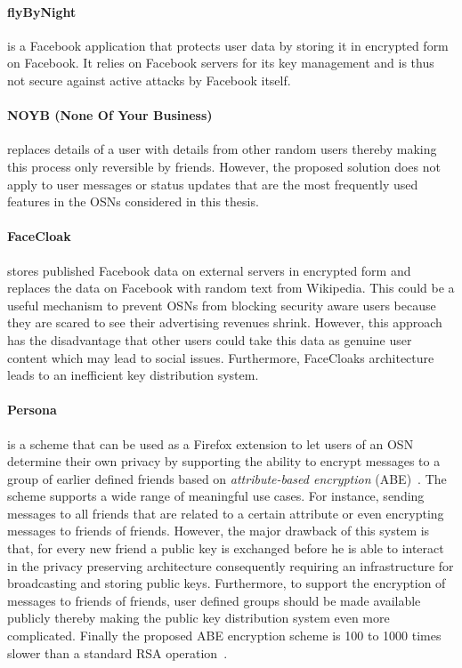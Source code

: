 \paragraph{flyByNight~\cite{art:LucasB09}} is a Facebook application that protects user data by storing it in encrypted form on Facebook. It relies on Facebook servers for its key management and is thus not secure against active attacks by Facebook itself.

\paragraph{NOYB (None Of Your Business)~\cite{art:GuhaSTF08}} replaces details of a user with details from other random users thereby making this process only reversible by friends. However, the proposed solution does not apply to user messages or status updates that are the most frequently used features in the OSNs considered in this thesis.

\paragraph{FaceCloak~\cite{art:LuoXH09}} stores published Facebook data on external servers in encrypted form and replaces the data on Facebook with random text from Wikipedia. This could be a useful mechanism to prevent OSNs from blocking security aware users because they are scared to see their advertising revenues shrink. However, this approach has the disadvantage that other users could take this data as genuine user content which may lead to social issues. Furthermore, FaceCloaks architecture leads to an inefficient key distribution system.

\paragraph{Persona~\cite{art:BadenBSBS09}} is a scheme that can be used as a Firefox extension to let users of an OSN determine their own privacy by supporting the ability to encrypt messages to a group of earlier defined friends based on \textit{attribute-based encryption} (ABE)~\cite{art:SahaiW04}. The scheme supports a wide range of meaningful use cases. For instance, sending messages to all friends that are related to a certain attribute or even encrypting messages to friends of friends. However, the major drawback of this system is that, for every new friend  a public key is exchanged before he is able to interact in the privacy preserving architecture consequently requiring an infrastructure for broadcasting and storing public keys. Furthermore, to support the encryption of messages to friends of friends, user defined groups should be made available publicly thereby making the public key distribution system even more complicated. Finally the proposed ABE encryption scheme is 100 to 1000 times slower than a standard RSA operation~\cite{art:BadenBSBS09}.

